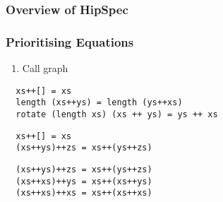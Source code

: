 \documentclass[serif,professionalfont]{beamer}
\newcommand\dn[0]{\vspace{\baselineskip}}
\begin{document}
\begin{frame}
  \frametitle{Overview of HipSpec}
  
\end{frame}


\begin{frame}[fragile]
  \frametitle{Prioritising Equations}

  \begin{overprint}
  \begin{minipage}{.5\linewidth}
  \begin{enumerate}
      \item Call graph
  \end{enumerate}
  \end{minipage}%
  \begin{minipage}{.5\linewidth}
  
  \end{minipage}

  \dn
  \dn



  \begin{verbatim}
  xs++[] = xs
  length (xs++ys) = length (ys++xs)
  rotate (length xs) (xs ++ ys) = ys ++ xs
  \end{verbatim}

  \begin{verbatim}
  xs++[] = xs
  (xs++ys)++zs = xs++(ys++zs)
  \end{verbatim}

  \begin{verbatim}
  (xs++ys)++zs = xs++(ys++zs)
  (xs++xs)++ys = xs++(xs++ys)
  (xs++xs)++xs = xs++(xs++xs)
  \end{verbatim}
  \end{overprint}

\end{frame}

\end{document}
